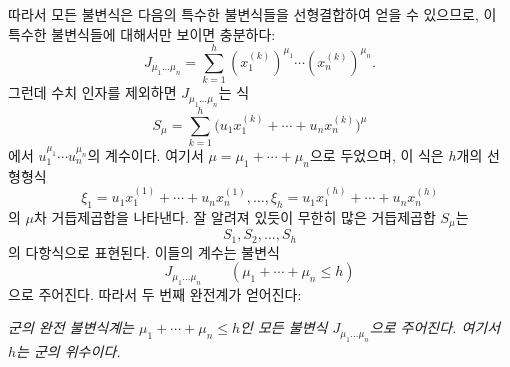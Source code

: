 
따라서 모든 불변식은 다음의 특수한 불변식들을 선형결합하여 얻을 수 있으므로, 이 특수한 불변식들에 대해서만 보이면 충분하다:
\[
  J_{\mu_1\ldots\mu_n}
  =\sum_{k=1}^{h}(x_1^{(k)})^{\mu_1}\cdots(x_n^{(k)})^{\mu_n}.
\]
그런데 수치 인자를 제외하면 $J_{\mu_1\ldots\mu_n}$는 식
\[
  S_\mu=\sum_{k=1}^{h}
  \bigl(u_1x_1^{(k)}+\cdots+u_nx_n^{(k)}\bigr)^{\mu}
\]
에서 $u_1^{\mu_1}\cdots u_n^{\mu_n}$의 계수이다. 여기서 $\mu=\mu_1+\cdots+\mu_n$으로 두었으며, 이 식은 $h$개의 선형형식
\[
  \xi_1=u_1x_1^{(1)}+\cdots+u_nx_n^{(1)},\ldots,
  \xi_h=u_1x_1^{(h)}+\cdots+u_nx_n^{(h)}
\]
의 $\mu$차 거듭제곱합을 나타낸다. 잘 알려져 있듯이 무한히 많은 거듭제곱합 $S_\mu$는
\[
  S_1,S_2,\ldots,S_h
\]
의 다항식으로 표현된다. 이들의 계수는 불변식
\[
  J_{\mu_1\ldots\mu_n}\qquad(\mu_1+\cdots+\mu_n\le h)
\]
으로 주어진다. 따라서 두 번째 완전계가 얻어진다:

\emph{군의 완전 불변식계는 $\mu_1+\cdots+\mu_n\le h$인 모든 불변식 $J_{\mu_1\ldots\mu_n}$으로 주어진다. 여기서 $h$는 군의 위수이다.}
